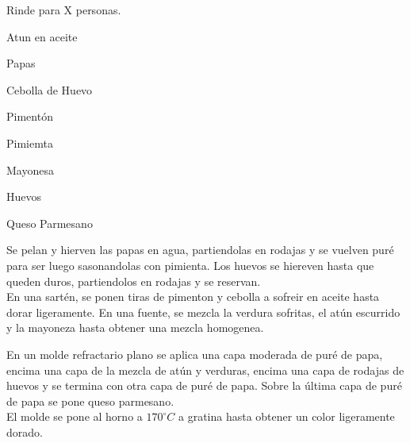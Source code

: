 
Rinde para X personas.\\

\begin{ingredientes}
\item Atun en aceite
\item Papas
\item Cebolla de Huevo
\item Pimentón
\item Pimiemta
\item Mayonesa
\item Huevos
\item Queso Parmesano
\end{ingredientes}
\preparacion

Se pelan y hierven las papas en agua, partiendolas en rodajas y se vuelven puré para ser luego sasonandolas con pimienta. Los huevos se hiereven hasta que queden duros, partiendolos en rodajas y se reservan.\\

En una sartén, se ponen tiras de pimenton y cebolla a sofreir en aceite hasta dorar ligeramente. En una fuente, se mezcla la verdura sofritas, el atún escurrido y la mayoneza hasta obtener una mezcla homogenea. 

En un molde refractario plano se aplica una capa moderada de puré de papa, encima una capa de la mezcla de atún y verduras, encima una capa de rodajas de huevos y se termina con otra capa de puré de papa. Sobre la última capa de puré de papa se pone queso parmesano.\\

El molde se pone al horno a $170^{\circ}C$  a gratina hasta obtener un color ligeramente dorado.
